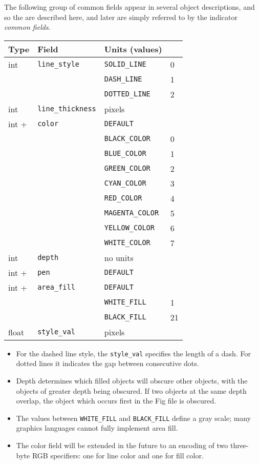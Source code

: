 The following group of common fields appear in several object
	descriptions, and so the are described here, and later are
	simply referred to by the indicator {\it common fields}.
%
\vspace{2pt}
\begin{center}
\begin{tabular} {|l|l|ll|}
\hline
Type	& Field			& Units (values)	&	\\ \hline
\hline
int	& {\tt line\_style}	& {\tt SOLID\_LINE}	& 0	\\
	&			& {\tt DASH\_LINE}	& 1	\\
	&			& {\tt DOTTED\_LINE}	& 2	\\ \hline
%
int	& {\tt line\_thickness}	& pixels		&	\\ \hline
%
int +	& {\tt color}		& {\tt DEFAULT}		& 	\\
 	&		        & {\tt BLACK\_COLOR}	& 0	\\
 	&              		& {\tt BLUE\_COLOR}	& 1	\\
 	&              		& {\tt GREEN\_COLOR}	& 2	\\ 
 	&              		& {\tt CYAN\_COLOR}	& 3	\\ 
 	&              		& {\tt RED\_COLOR}	& 4	\\ 
 	&              		& {\tt MAGENTA\_COLOR}	& 5	\\ 
 	&              		& {\tt YELLOW\_COLOR}	& 6	\\ 
 	&              		& {\tt WHITE\_COLOR}	& 7	\\ \hline
%
int  	& {\tt depth}		& no units		&	\\ \hline
%
int +	& {\tt pen}		& {\tt DEFAULT}		&	\\ \hline
%
int +	& {\tt area\_fill}	& {\tt DEFAULT}		& 	\\
	&			& {\tt WHITE\_FILL}	&   1	\\
	&			& {\tt BLACK\_FILL}	&   21	\\ \hline
%
float	& {\tt style\_val}	& pixels		&	\\ \hline
\end{tabular}
\end{center}
\vspace{4pt}

\begin{itemize}
\item For the dashed line style, the {\tt style\_val}	specifies the length of a dash.
For dotted lines it indicates the gap between consecutive dots. 

\item Depth determines which filled objects will obscure other objects,
	with the objects of greater depth being obscured.
If two objects at the same depth overlap, the object which occurs first
	in the Fig file is obscured.

\item The values between {\tt WHITE\_FILL} and {\tt BLACK\_FILL} define
	a gray scale; many graphics languages cannot fully implement area fill.

\item The color field will be extended in the future to an encoding of two
	three-byte RGB specifiers: one for line color and one for fill color.
\end{itemize}


